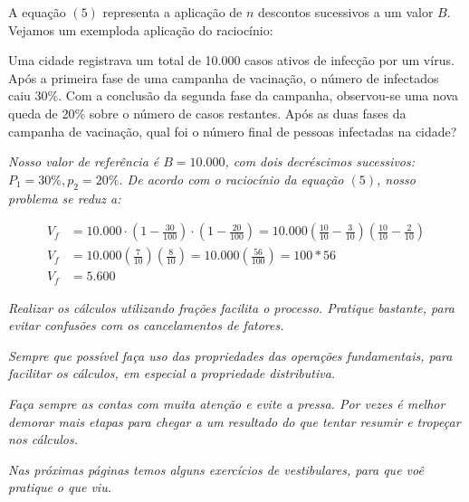 \documentclass[12pt, a4paper, brazil]{abntex2}
\begin{document}
    \vspace{1.2em}A equação $(5)$ representa a aplicação de $n$ descontos sucessivos a um valor $B$. Vejamos um exemploda aplicação do raciocínio:

        \begin{exemplo}
            Uma cidade registrava um total de 10.000 casos ativos de infecção por um vírus. Após a primeira fase de uma campanha de vacinação, o número de infectados caiu 30\%. Com a conclusão da segunda fase da campanha, observou-se uma nova queda de 20\% sobre o número de casos restantes.
            Após as duas fases da campanha de vacinação, qual foi o número final de pessoas infectadas na cidade?
            
            \vspace{1em}
            \textit{Nosso valor de referência é $B = 10.000$, com dois decréscimos sucessivos: $P_1=30\%, p_2=20\%$. De acordo com o raciocínio da equação $(5)$, nosso problema se reduz a:}

            \begin{equation*}
                \begin{aligned}
                V_f&=10.000 \cdot\left(1-\frac{30}{100}\right)\cdot \left(1 - \frac{20}{100}\right)=10.000\left(\frac{10}{10}-\frac{3}{10}\right)\left(\frac{10}{10}-\frac{2}{10}\right)\\
                V_f&=10.000\left(\frac{7}{10}\right)\left(\frac{8}{10}\right)=10.000\left(\frac{56}{100}\right)=100*56\\
                V_f&=5.600
                \end{aligned}
            \end{equation*}
        \end{exemplo}

    \hrulefill\bigskip

        \textit{Realizar os cálculos utilizando frações facilita o processo. Pratique bastante, para evitar confusões com os cancelamentos de fatores.}
        
        \textit{Sempre que possível faça uso das propriedades das operações fundamentais, para facilitar os cálculos, em especial a propriedade distributiva.}

        \textit{Faça sempre as contas com muita atenção e evite a pressa. Por vezes é melhor demorar mais etapas para chegar a um resultado do que tentar resumir e tropeçar nos cálculos.}

        \textit{Nas próximas páginas temos alguns exercícios de vestibulares, para que voê pratique o que viu.}
    
\end{document}
